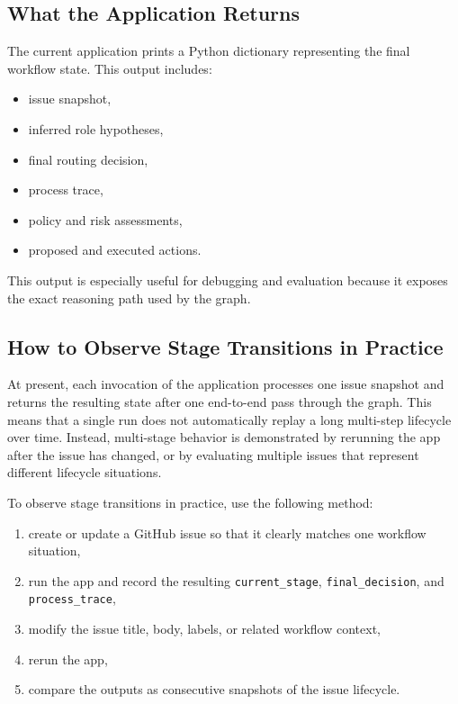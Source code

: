 \documentclass[11pt,a4paper]{article}
\begin{document}
\subsection{What the Application Returns}

The current application prints a Python dictionary representing the final workflow state. This output includes:
\begin{itemize}
    \item issue snapshot,
    \item inferred role hypotheses,
    \item final routing decision,
    \item process trace,
    \item policy and risk assessments,
    \item proposed and executed actions.
\end{itemize}

This output is especially useful for debugging and evaluation because it exposes the exact reasoning path used by the graph.

\subsection{How to Observe Stage Transitions in Practice}

At present, each invocation of the application processes one issue snapshot and returns the resulting state after one end-to-end pass through the graph. This means that a single run does not automatically replay a long multi-step lifecycle over time. Instead, multi-stage behavior is demonstrated by rerunning the app after the issue has changed, or by evaluating multiple issues that represent different lifecycle situations.

To observe stage transitions in practice, use the following method:
\begin{enumerate}
    \item create or update a GitHub issue so that it clearly matches one workflow situation,
    \item run the app and record the resulting \texttt{current\_stage}, \texttt{final\_decision}, and \texttt{process\_trace},
    \item modify the issue title, body, labels, or related workflow context,
    \item rerun the app,
    \item compare the outputs as consecutive snapshots of the issue lifecycle.
\end{enumerate}
\end{document}
